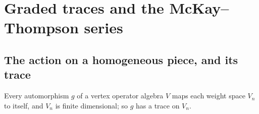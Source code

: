 \section{Graded traces and the McKay--Thompson series}\label{ch16:sec:trace}

\subsection{The action on a homogeneous piece, and its trace}

Every automorphism $g$ of a vertex operator algebra $V$ maps each weight space $V_n$ to itself, and $V_n$ is finite
dimensional; so $g$ has a trace on $V_n$.

